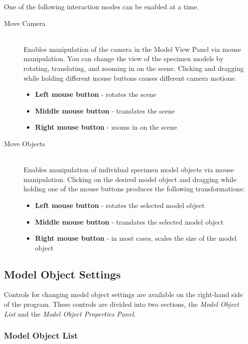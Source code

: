 \documentclass[11pt,titlepage,twoside]{article}
\begin{document}
One of the following interaction modes can be enabled at a time.

\begin{description}

  \item[Move Camera] \hfill \\
  Enables manipulation of the camera in the Model View Panel via mouse manipulation. You can change the view of the specimen models by rotating, translating, and zooming in on the scene. Clicking and dragging while holding different mouse buttons causes different camera motions:

\begin{itemize}
\item \textbf{Left mouse button} - rotates the scene
\item \textbf{Middle mouse button} - translates the scene
\item \textbf{Right mouse button} - zooms in on the scene
\end{itemize}

  \item[Move Objects] \hfill \\
  Enables manipulation of individual specimen model objects via mouse manipulation. Clicking on the desired model object and dragging while holding one of the mouse buttons produces the following transformations:
  
\begin{itemize}
\item \textbf{Left mouse button} - rotates the selected model object
\item \textbf{Middle mouse button} - translates the selected model object
\item \textbf{Right mouse button} - in most cases, scales the size of the model object
\end{itemize}

\end{description}

\subsection{Model Object Settings}

Controls for changing model object settings are available on the right-hand side of the program. These controls are divided into two sections, the \emph{Model Object List} and the \emph{Model Object Properties Panel}.

\subsubsection{Model Object List}
\end{document}
